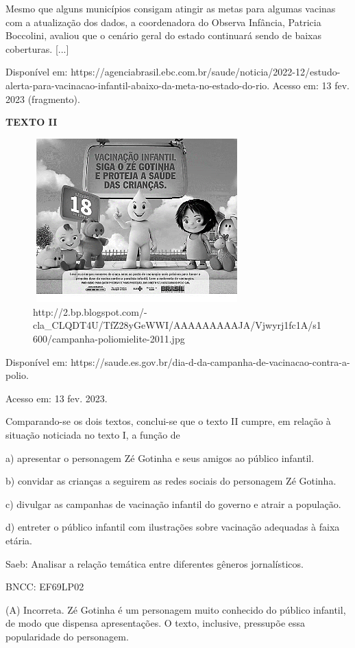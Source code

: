 Mesmo que alguns municípios consigam atingir as metas para algumas
vacinas com a atualização dos dados, a coordenadora do Observa Infância,
Patricia Boccolini, avaliou que o cenário geral do estado continuará
sendo de baixas coberturas. {[}...{]}

Disponível em:
https://agenciabrasil.ebc.com.br/saude/noticia/2022-12/estudo-alerta-para-vacinacao-infantil-abaixo-da-meta-no-estado-do-rio.
Acesso em: 13 fev. 2023 (fragmento).

\textbf{TEXTO II}

\begin{figure}
\centering
\includegraphics[width=3.15625in,height=2.48418in]{./imgSAEB_8_POR/media/image32.png}
\caption{http://2.bp.blogspot.com/-cla\_CLQDT4U/TfZ28yGeWWI/AAAAAAAAAJA/Vjwyrj1fc1A/s1600/campanha-poliomielite-2011.jpg}
\end{figure}

Disponível em:
https://saude.es.gov.br/dia-d-da-campanha-de-vacinacao-contra-a-polio.

Acesso em: 13 fev. 2023.

Comparando-se os dois textos, conclui-se que o texto II cumpre, em
relação à situação noticiada no texto I, a função de

a) apresentar o personagem Zé Gotinha e seus amigos ao público infantil.

b) convidar as crianças a seguirem as redes sociais do personagem Zé
Gotinha.

c) divulgar as campanhas de vacinação infantil do governo e atrair a
população.

d) entreter o público infantil com ilustrações sobre vacinação adequadas
à faixa etária.

Saeb: Analisar a relação temática entre diferentes gêneros
jornalísticos.

BNCC: EF69LP02

(A) Incorreta. Zé Gotinha é um personagem muito conhecido do público
infantil, de modo que dispensa apresentações. O texto, inclusive,
pressupõe essa popularidade do personagem.

